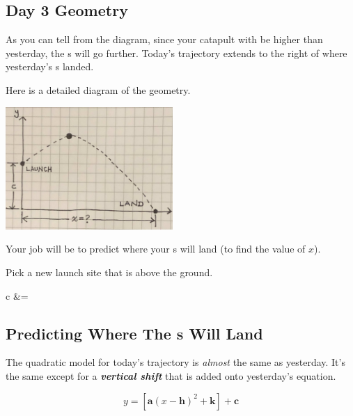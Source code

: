\subsection{Day 3 Geometry}

As you can tell from the diagram, 
since your catapult with be higher than yesterday,
the \mymm{}s will go further.
Today's trajectory extends to the right of where yesterday's \mymm{}s landed.

Here is a detailed diagram of the geometry.
\begin{center}
    \includegraphics[width=2.5in]{../day3-geometry.jpg}
\end{center}

Your job will be to predict where your \mymm{}s will land
(to find the value of $x$).

Pick a new launch site that is above the ground.

\begin{tcolorbox}[colback=\myFillinColor,ams align]
    \label{c-value}
    c &= 
\end{tcolorbox}





\subsection{Predicting Where The \mymm{}s Will Land}

The quadratic model for today's trajectory 
is {\itshape almost} the same as yesterday.
It's the same except for a {\bfseries\itshape vertical shift} that is added onto yesterday's equation.

\begin{equation}\label{shifted-model}
    y = \left[\bm{a}(x-\bm{h})^2 + \bm{k}\right] + \bm{c}
\end{equation} 

